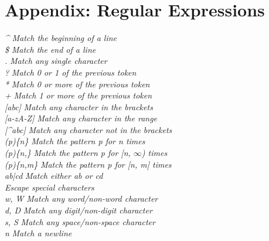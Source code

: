 \section*{Appendix: Regular Expressions}

\emph{\^{}} \hfill \textit{Match the beginning of a line}\\
\emph{\$} \hfill \textit{Match the end of a line}\\
\emph{.} \hfill \textit{Match any single character}\\
\emph{?} \hfill \textit{Match 0 or 1 of the previous token}\\
\emph{*} \hfill \textit{Match 0 or more of the previous token}\\
\emph{+} \hfill \textit{Match 1 or more of the previous token}\\
\emph{[abc]} \hfill \textit{Match any character in the brackets}\\
\emph{[a-zA-Z]} \hfill \textit{Match any character in the range}\\
\emph{[\^{}abc]} \hfill \textit{Match any character not in the brackets}\\
\emph{(p)\{n\}} \hfill \textit{Match the pattern p for n times}\\
\emph{(p)\{n,\}} \hfill \textit{Match the pattern p for [n, $\infty$) times}\\
\emph{(p)\{n,m\}} \hfill \textit{Match the pattern p for [n, m] times}\\
\emph{ab|cd} \hfill \textit{Match either ab or cd}\\
\emph{\bs} \hfill \textit{Escape special characters}\\
\emph{\bs w, \bs W} \hfill \textit{Match any word/non-word character}\\
\emph{\bs d, \bs D} \hfill \textit{Match any digit/non-digit character}\\
\emph{\bs s, \bs S} \hfill \textit{Match any space/non-space character}\\
\emph{\bs n} \hfill \textit{Match a newline}\\